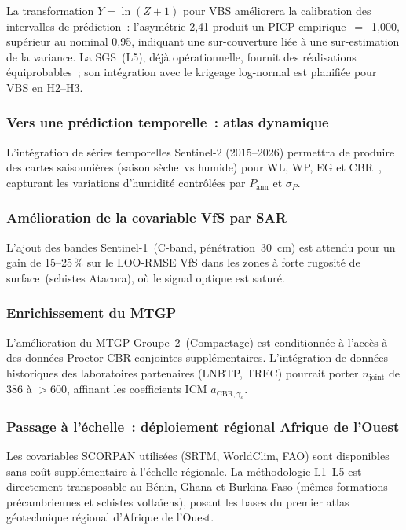 \documentclass[10pt,a4paper,twocolumn]{article}
\begin{document}
	La transformation $Y=\ln(Z+1)$ pour VBS améliorera la
	calibration des intervalles de prédiction~: l'asymétrie 2{,}41
	produit un PICP empirique~$=$~1{,}000, supérieur au nominal 0{,}95,
	indiquant une sur-couverture liée à une sur-estimation de la variance.
	La SGS~(L5), déjà opérationnelle, fournit des réalisations
	équiprobables~; son intégration avec le krigeage log-normal est
	planifiée pour VBS en H2--H3.
	
	\subsubsection{Vers une prédiction temporelle~: atlas dynamique}
	
	L'intégration de séries temporelles Sentinel-2 (2015--2026)
	permettra de produire des cartes saisonnières (saison sèche~vs
	humide) pour WL, WP, EG et CBR~\cite{gundogdu2007spatial},
	capturant les variations d'humidité contrôlées par
	$P_{\mathrm{ann}}$ et $\sigma_P$.
	
	\subsubsection{Amélioration de la covariable VfS par SAR}
	
	L'ajout des bandes Sentinel-1~(C-band, pénétration~30~cm) est
	attendu pour un gain de 15--25\,\% sur le LOO-RMSE VfS dans les
	zones à forte rugosité de surface~(schistes Atacora), où le signal
	optique est saturé.
	
	\subsubsection{Enrichissement du MTGP}
	
	L'amélioration du MTGP Groupe~2~(Compactage) est conditionnée à
	l'accès à des données Proctor-CBR conjointes supplémentaires.
	L'intégration de données historiques des laboratoires partenaires
	(LNBTP, TREC) pourrait porter $n_{\mathrm{joint}}$ de 386 à
	$>600$, affinant les coefficients ICM $a_{\mathrm{CBR},\gamma_d}$.
	
	\subsubsection{Passage à l'échelle~: déploiement régional Afrique de l'Ouest}
	
	Les covariables SCORPAN utilisées (SRTM, WorldClim, FAO) sont
	disponibles sans coût supplémentaire à l'échelle régionale.
	La méthodologie L1--L5 est directement transposable au Bénin,
	Ghana et Burkina Faso (mêmes formations précambriennes et
	schistes voltaïens), posant les bases du premier atlas
	géotechnique régional d'Afrique de l'Ouest.
	
\end{document}
